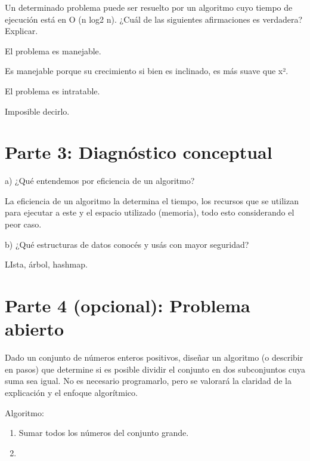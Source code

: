 \documentclass[11pt]{article}
\begin{document}
Un determinado problema puede ser resuelto por un algoritmo cuyo tiempo de ejecución
está en O (n log2 n). ¿Cuál de las siguientes afirmaciones es verdadera? Explicar.

El problema es manejable.

Es manejable porque su crecimiento si bien es inclinado, es más suave
que x². 

El problema es intratable.

Imposible decirlo.



\section{Parte 3: Diagnóstico conceptual}
\label{sec:org05b545e}

a) ¿Qué entendemos por eficiencia de un algoritmo?

La eficiencia de un algoritmo la determina el tiempo, los recursos que
se utilizan para ejecutar a este y el espacio utilizado (memoria), todo esto
considerando el peor caso.

b) ¿Qué estructuras de datos conocés y usás con mayor seguridad?


LIsta, árbol, hashmap.




\section{Parte 4 (opcional): Problema abierto}
\label{sec:orge9e5733}

Dado un conjunto de números enteros positivos, diseñar un algoritmo (o describir en pasos)
que determine si es posible dividir el conjunto en dos subconjuntos cuya suma sea igual. No
es necesario programarlo, pero se valorará la claridad de la explicación y el enfoque
algorítmico.



Algoritmo:

\begin{enumerate}
\item Sumar todos los números del conjunto grande.
\item 
\end{enumerate}
\end{document}
